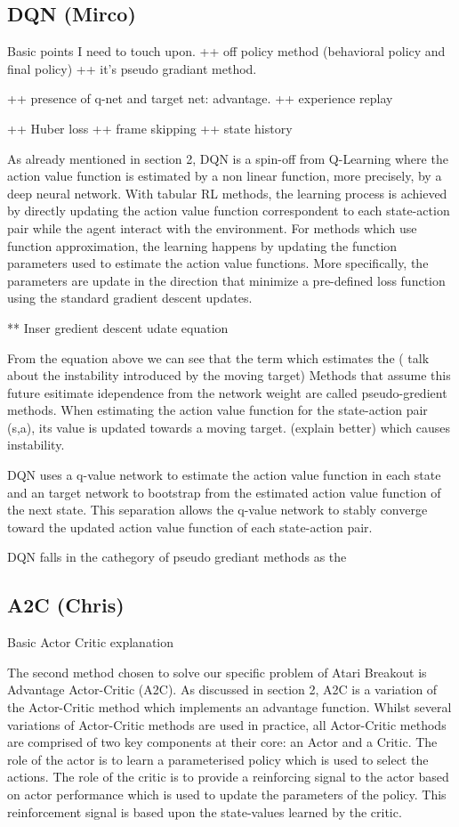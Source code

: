 \documentclass{article}
\begin{document}
\subsection{DQN (Mirco)}
Basic points I need to touch upon.
++ off policy method (behavioral policy and final policy)
++ it's pseudo gradiant method.

++ presence of q-net and target net: advantage.
++ experience replay

++ Huber loss
++ frame skipping
++ state history

As already mentioned in section 2, DQN is a spin-off from Q-Learning where the action value function is estimated by a non linear function, more precisely, by a deep neural network.
With tabular RL  methods, the learning process is achieved by directly updating the action value function correspondent to each state-action pair while the agent interact with the environment. For methods which use function approximation, the learning happens by updating the function parameters used to estimate the action value functions. More specifically, the parameters are update in the direction that minimize a pre-defined loss function using the standard gradient descent updates.

** Inser gredient descent udate equation

From the equation above we can see that the term which estimates the  ( talk  about the  instability  introduced by the moving target)
Methods that assume this future esitimate idependence from the network weight are called pseudo-gredient methods.
When estimating the action value function for the state-action pair (s,a), its value is updated towards a moving target. (explain better) which causes instability.  

DQN uses a q-value network to estimate the action value function in each state and an target network to bootstrap from the estimated action value function of the next state. This separation allows the q-value network to stably converge toward the updated action value function of each state-action pair.


DQN falls in the cathegory of pseudo grediant methods as the 




\subsection{A2C (Chris)}


Basic Actor Critic explanation

The second method chosen to solve our specific problem of Atari Breakout is Advantage Actor-Critic (A2C). As discussed in section 2, A2C is a variation of the Actor-Critic method which implements an advantage function. Whilst several variations of Actor-Critic methods are used in practice, all Actor-Critic methods are comprised of two key components at their core: an Actor and a Critic. The role of the actor is to learn a parameterised policy which is used to select the actions. The role of the critic is to provide a reinforcing signal to the actor based on actor performance which is used to update the parameters of the policy. This reinforcement signal is based upon the state-values learned by the critic.
\end{document}
